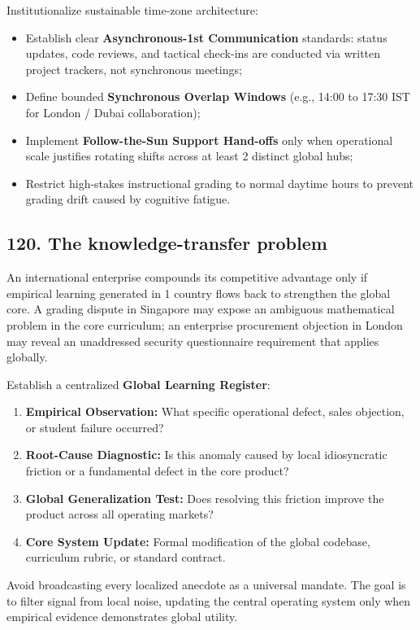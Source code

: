 Institutionalize sustainable time-zone architecture:
\begin{itemize}
    \item Establish clear \textbf{Asynchronous-1st Communication} standards: status updates, code reviews, and tactical check-ins are conducted via written project trackers, not synchronous meetings;
    \item Define bounded \textbf{Synchronous Overlap Windows} (e.g., 14:00 to 17:30 IST for London / Dubai collaboration);
    \item Implement \textbf{Follow-the-Sun Support Hand-offs} only when operational scale justifies rotating shifts across at least 2 distinct global hubs;
    \item Restrict high-stakes instructional grading to normal daytime hours to prevent grading drift caused by cognitive fatigue.
\end{itemize}

\subsection{120. The knowledge-transfer problem}

An international enterprise compounds its competitive advantage only if empirical learning generated in 1 country flows back to strengthen the global core. A grading dispute in Singapore may expose an ambiguous mathematical problem in the core curriculum; an enterprise procurement objection in London may reveal an unaddressed security questionnaire requirement that applies globally.

Establish a centralized \textbf{Global Learning Register}:
\begin{enumerate}
    \item \textbf{Empirical Observation:} What specific operational defect, sales objection, or student failure occurred?
    \item \textbf{Root-Cause Diagnostic:} Is this anomaly caused by local idiosyncratic friction or a fundamental defect in the core product?
    \item \textbf{Global Generalization Test:} Does resolving this friction improve the product across all operating markets?
    \item \textbf{Core System Update:} Formal modification of the global codebase, curriculum rubric, or standard contract.
\end{enumerate}
Avoid broadcasting every localized anecdote as a universal mandate. The goal is to filter signal from local noise, updating the central operating system only when empirical evidence demonstrates global utility.

